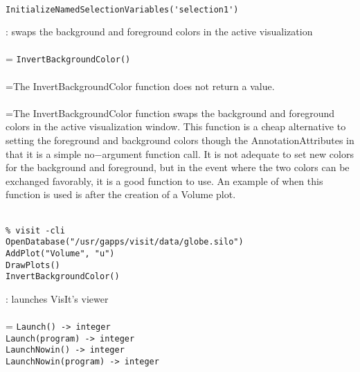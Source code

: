 \documentclass[10pt,a4paper]{report}
\begin{document}
\\[-6mm]
\begin{verbatim}InitializeNamedSelectionVariables('selection1')
\end{verbatim}
\newpage


{}
: swaps the background and foreground colors in the active visualization\\[-3mm]

 \\ 
\hangindent=\parindent 
\verb!InvertBackgroundColor()!\\ [-3mm]

 \\ 
\hangindent=\parindent The InvertBackgroundColor function does not return a value. \\[-3mm] 

 \\ 
\hangindent=\parindent The InvertBackgroundColor function swaps the background and foreground colors in the active visualization window. This function is a cheap alternative to setting the foreground and background colors though the AnnotationAttributes in that it is a simple no$-$argument function call. It is not adequate to set new colors for the background and foreground, but in the event where the two colors can be exchanged favorably, it is a good function to use. An example of when this function is used is after the creation of a Volume plot. \\[-3mm] 

\\[-6mm]
\begin{verbatim}% visit -cli
OpenDatabase("/usr/gapps/visit/data/globe.silo")
AddPlot("Volume", "u")
DrawPlots()
InvertBackgroundColor()
\end{verbatim}
\newpage


{}
: launches VisIt's viewer\\[-3mm]

 \\ 
\hangindent=\parindent 
\verb!Launch() -> integer!\\ 
\verb!Launch(program) -> integer!\\ 
\verb!LaunchNowin() -> integer!\\ 
\verb!LaunchNowin(program) -> integer!\\ [-3mm]
\end{document}

